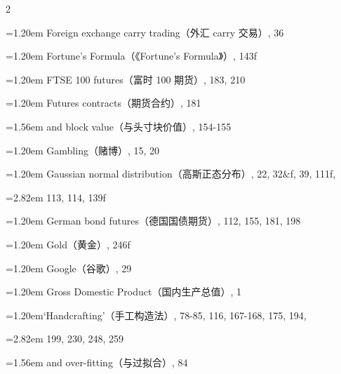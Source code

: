 {\begin{multicols}{2}
\par \noindent\hangindent=1.20em\hspace*{0.00em} Foreign exchange carry trading（外汇 carry 交易）, 36
\par \noindent\hangindent=1.20em\hspace*{0.00em} Fortune’s Formula（《Fortune’s Formula》）, 143f
\par \noindent\hangindent=1.20em\hspace*{0.00em} FTSE 100 futures（富时 100 期货）, 183, 210
\par \noindent\hangindent=1.20em\hspace*{0.00em} Futures contracts（期货合约）, 181
\par \noindent\hangindent=1.56em\hspace*{0.36em} and block value（与头寸块价值）, 154-155
\par \noindent\hangindent=1.20em\hspace*{0.00em} Gambling（赌博）, 15, 20
\par \noindent\hangindent=1.20em\hspace*{0.00em} Gaussian normal distribution（高斯正态分布）, 22, 32\&f, 39, 111f,
\par \noindent\hangindent=2.82em\hspace*{1.62em} 113, 114, 139f
\par \noindent\hangindent=1.20em\hspace*{0.00em} German bond futures（德国国债期货）, 112, 155, 181, 198
\par \noindent\hangindent=1.20em\hspace*{0.00em} Gold（黄金）, 246f
\par \noindent\hangindent=1.20em\hspace*{0.00em} Google（谷歌）, 29
\par \noindent\hangindent=1.20em\hspace*{0.00em} Gross Domestic Product（国内生产总值）, 1
\par \noindent\hangindent=1.20em\hspace*{0.00em}‘Handcrafting’（手工构造法）, 78-85, 116, 167-168, 175, 194,
\par \noindent\hangindent=2.82em\hspace*{1.62em} 199, 230, 248, 259
\par \noindent\hangindent=1.56em\hspace*{0.36em} and over-fitting（与过拟合）, 84

\end{multicols}}
